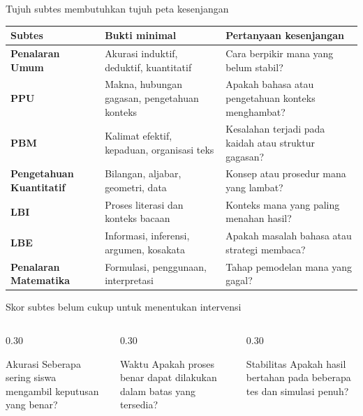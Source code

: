\begin{frame}[shrink=8]{Tujuh subtes membutuhkan tujuh peta kesenjangan}
  {\fontsize{9.25}{11.5}\selectfont
  \renewcommand{\arraystretch}{0.93}
  \begin{tabularx}{\textwidth}{>{\bfseries\color{StudentBlue}}p{} >{\RaggedRight\arraybackslash}X >{\RaggedRight\arraybackslash}p{}}
    \toprule
    \textbf{Subtes} & \textbf{Bukti minimal} & \textbf{Pertanyaan kesenjangan} \\
    \midrule
    Penalaran Umum & Akurasi induktif, deduktif, kuantitatif & Cara berpikir mana yang belum stabil? \\
    PPU & Makna, hubungan gagasan, pengetahuan konteks & Apakah bahasa atau pengetahuan konteks menghambat? \\
    PBM & Kalimat efektif, kepaduan, organisasi teks & Kesalahan terjadi pada kaidah atau struktur gagasan? \\
    Pengetahuan Kuantitatif & Bilangan, aljabar, geometri, data & Konsep atau prosedur mana yang lambat? \\
    LBI & Proses literasi dan konteks bacaan & Konteks mana yang paling menahan hasil? \\
    LBE & Informasi, inferensi, argumen, kosakata & Apakah masalah bahasa atau strategi membaca? \\
    Penalaran Matematika & Formulasi, penggunaan, interpretasi & Tahap pemodelan mana yang gagal? \\
    \bottomrule
  \end{tabularx}}
\end{frame}

\begin{frame}{Skor subtes belum cukup untuk menentukan intervensi}
  \begin{columns}[T,onlytextwidth]
    \begin{column}{0.30\textwidth}
      \begin{block}{Akurasi}
        Seberapa sering siswa mengambil keputusan yang benar?
      \end{block}
    \end{column}
    \begin{column}{0.30\textwidth}
      \begin{block}{Waktu}
        Apakah proses benar dapat dilakukan dalam batas yang tersedia?
      \end{block}
    \end{column}
    \begin{column}{0.30\textwidth}
      \begin{block}{Stabilitas}
        Apakah hasil bertahan pada beberapa tes dan simulasi penuh?
      \end{block}
    \end{column}
  \end{columns}
  \vspace{0.26cm}
\end{frame}

